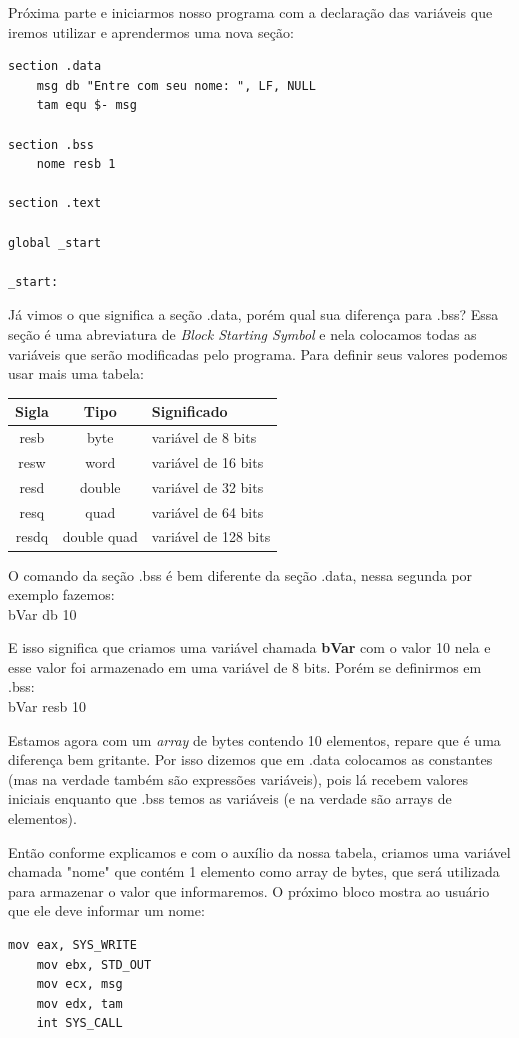 Próxima parte e iniciarmos nosso programa com a declaração das variáveis que iremos utilizar e aprendermos uma nova seção:
\begin{lstlisting}[]
section .data
	msg db "Entre com seu nome: ", LF, NULL
	tam equ $- msg

section .bss
	nome resb 1

section .text

global _start

_start:
\end{lstlisting}

Já vimos o que significa a seção .data, porém qual sua diferença para .bss? Essa seção é uma abreviatura de \textit{Block Starting Symbol} e nela colocamos todas as variáveis que serão modificadas pelo programa. Para definir seus valores podemos usar mais uma tabela:
\begin{table}[H]
	\centering 
	\begin{tabular}{c | c | l }
		\textbf{Sigla} & \textbf{Tipo} & \textbf{Significado} \\ \hline
		resb & byte & variável de 8 bits \\
		resw & word & variável de 16 bits \\
		resd & double & variável de 32 bits \\
		resq & quad & variável de 64 bits \\
		resdq & double quad & variável de 128 bits
	\end{tabular}
\end{table}

O comando da seção .bss é bem diferente da seção .data, nessa segunda por exemplo fazemos: \\
{\ttfamily bVar db 10}

E isso significa que criamos uma variável chamada \textbf{bVar} com o valor 10 nela e esse valor foi armazenado em uma variável de 8 bits. Porém se definirmos em .bss: \\
{\ttfamily bVar resb 10}

Estamos agora com um \textit{array} de bytes contendo 10 elementos, repare que é uma diferença bem gritante. Por isso dizemos que em .data colocamos as constantes (mas na verdade também são expressões variáveis), pois lá recebem valores iniciais enquanto que .bss temos as variáveis (e na verdade são arrays de elementos).

Então conforme explicamos e com o auxílio da nossa tabela, criamos uma variável chamada "nome" que contém 1 elemento como array de bytes, que será utilizada para armazenar o valor que informaremos. O próximo bloco mostra ao usuário que ele deve informar um nome:
\begin{lstlisting}[]
	mov eax, SYS_WRITE
	mov ebx, STD_OUT
	mov ecx, msg
	mov edx, tam
	int SYS_CALL
\end{lstlisting}

